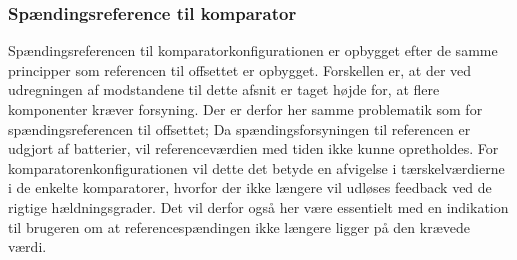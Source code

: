 \subsubsection{Spændingsreference til komparator}
Spændingsreferencen til komparatorkonfigurationen er opbygget efter de samme principper som referencen til offsettet er opbygget. Forskellen er, at der ved udregningen af modstandene til dette afsnit er taget højde for, at flere komponenter kræver forsyning. Der er derfor her samme problematik som for spændingsreferencen til offsettet; Da spændingsforsyningen til referencen er udgjort af batterier, vil referenceværdien med tiden ikke kunne opretholdes. For komparatorenkonfigurationen vil dette det betyde en afvigelse i tærskelværdierne i de enkelte komparatorer, hvorfor der ikke længere vil udløses feedback ved de rigtige hældningsgrader. Det vil derfor også her være essentielt med en indikation til brugeren om at referencespændingen ikke længere ligger på den krævede værdi. 


